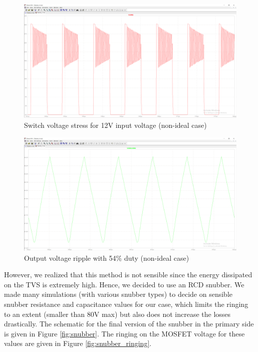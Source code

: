 \documentclass[12pt]{article}
\begin{document}
    \begin{figure}[H]
        \centering
        \includegraphics[scale=0.3]{img/Spice_Sim/Non-ideal/non-ideal_diode_switch_stresses_Vs_12V.PNG}
        \caption{Switch voltage stress for 12V input voltage (non-ideal case)}
        \label{fig:non-ideal_V_stress}
    \end{figure}

    \begin{figure}[H]
        \centering
        \includegraphics[scale=0.3]{img/Spice_Sim/Non-ideal/non-ideal_output_54duty.PNG}
        \caption{Output voltage ripple with 54\% duty (non-ideal case)}
        \label{fig:non-ideal_output}
    \end{figure}

    However, we realized that this method is not sensible since the energy dissipated on the TVS is extremely high. Hence, we decided to use an RCD snubber. We made many simulations (with various snubber types) to decide on sensible snubber resistance and capacitance values for our case, which limits the ringing to an extent (smaller than 80V max) but also does not increase the losses drastically. The schematic for the final version of the snubber in the primary side is given in Figure \ref{fig:snubber}. The ringing on the MOSFET voltage for these values are given in Figure \ref{fig:snubber_ringing}.
\end{document}
